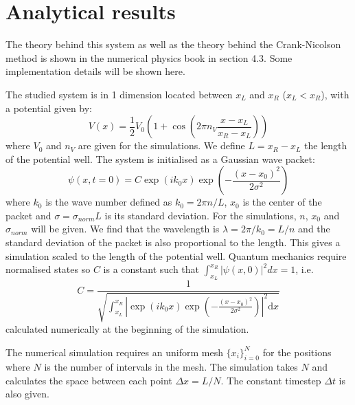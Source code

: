 \section{Analytical results}

The theory behind this system as well as the theory behind the Crank-Nicolson method is shown in the numerical physics book \cite{physnumbook} in section 4.3. Some implementation details will be shown here.

The studied system is in 1 dimension located between \(x_L\) and \(x_R\) (\(x_L < x_R\)), with a potential given by:
\begin{equation}
    V(x) = \frac{1}{2} V_0 \left( 1 + \cos \left( 2\pi n_V \frac{x - x_L}{x_R - x_L} \right) \right)
\end{equation}
where \(V_0\) and \(n_V\) are given for the simulations. We define \(L = x_R - x_L\) the length of the potential well. The system is initialised as a Gaussian wave packet:
\begin{equation}
    \psi(x, t=0) = C \exp(i k_0 x)\exp\left(-\frac{(x-x_0)^2}{2\sigma^2}\right)
\end{equation}
where $k_0$ is the wave number defined as $k_0 = 2\pi n/L$, $x_0$ is the center of the packet and \mbox{$\sigma = \sigma_{norm}L$} is its standard deviation. For the simulations, $n$, $x_0$ and $\sigma_{norm}$ will be given. We find that the wavelength is $\lambda = 2\pi/k_0 = L/n$ and the standard deviation of the packet is also proportional to the length. This gives a simulation scaled to the length of the potential well. Quantum mechanics require normalised states so \(C\) is a constant such that \mbox{\(\int_{x_L}^{x_R}|\psi(x,0)|^2 dx = 1\)}, i.e.
\begin{equation}
    C = \frac{1}{\sqrt{\int_{x_L}^{x_R} \left|\exp(i k_0 x)\exp\left(-\frac{(x-x_0)^2}{2\sigma^2}\right)\right|^2 \mathrm{d}x}}
    \label{eq:c_norm}
\end{equation}
calculated numerically at the beginning of the simulation.

The numerical simulation requires an uniform mesh $\{x_i\}_{i=0}^N$ for the positions where $N$ is the number of intervals in the mesh. The simulation takes $N$ and calculates the space between each point $\Delta x = L/N$. The constant timestep $\Delta t$ is also given.

